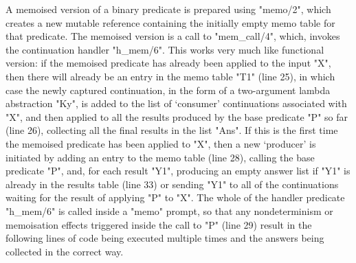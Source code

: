 A memoised version of a binary predicate is 
prepared using "memo/2", which creates a new mutable reference containing the initially
empty memo table for that predicate. The memoised version is a call to "mem_call/4", 
which, invokes the continuation handler "h_mem/6". This works very much like 
 functional version: if the memoised predicate has already been applied to
the input "X", then there will already be an entry in the memo table "T1" (line 25), in which case the
newly captured continuation, in the form of a two-argument lambda abstraction "Ky", is added to the 
list of `consumer' continuations associated with "X", and then applied to all
the results produced by the base predicate "P" so far (line 26), collecting all the 
final results in the list "Ans". If this is the first time the memoised predicate has been applied to 
"X", then a new `producer' is initiated  by adding an entry to the memo table (line 28), calling the base
predicate "P", and, for each result "Y1", producing an empty answer list if "Y1" is 
already in the results table (line 33) or sending "Y1" to all of the continuations waiting for the
result of applying "P" to "X". The whole of the handler predicate "h_mem/6" is called inside a
"memo" prompt, so that any nondeterminism or memoisation effects triggered inside the call to "P" 
(line 29) result in the following lines of code being executed multiple times and the answers being collected
in the correct way.

